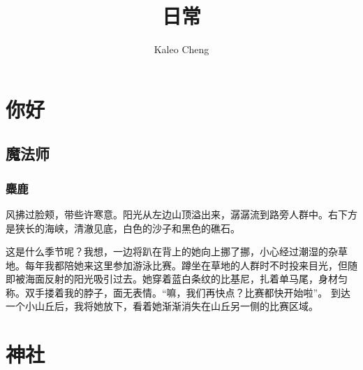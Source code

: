 


\title{日常}
\date{ }
\author{Kaleo Cheng}
\maketitle


\tableofcontents
\newpage
\listoffigures
\newpage

\section{你好}
\subsection{魔法师}


\subsubsection{麋鹿}
风拂过脸颊，带些许寒意。阳光从左边山顶溢出来，潺潺流到路旁人群中。右下方是狭长的海峡，清澈见底，白色的沙子和黑色的礁石。

这是什么季节呢？我想，一边将趴在背上的她向上挪了挪，小心经过潮湿的杂草地。每年我都陪她来这里参加游泳比赛。蹲坐在草地的人群时不时投来目光，但随即被海面反射的阳光吸引过去。她穿着蓝白条纹的比基尼，扎着单马尾，身材匀称。双手搂着我的脖子，面无表情。“嘛，我们再快点？比赛都快开始啦”。
到达一个小山丘后，我将她放下，看着她渐渐消失在山丘另一侧的比赛区域。


\section{神社}



